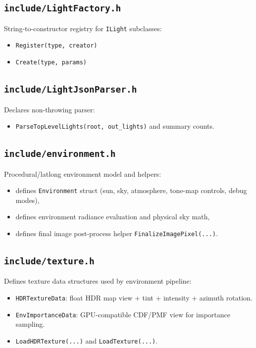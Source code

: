 \documentclass[11pt]{article}
\begin{document}
\subsection{\texttt{include/LightFactory.h}}
String-to-constructor registry for \verb|ILight| subclasses:
\begin{itemize}[leftmargin=1.5em]
  \item \verb|Register(type, creator)|
  \item \verb|Create(type, params)|
\end{itemize}

\subsection{\texttt{include/LightJsonParser.h}}
Declares non-throwing parser:
\begin{itemize}[leftmargin=1.5em]
  \item \verb|ParseTopLevelLights(root, out_lights)| and summary counts.
\end{itemize}

\subsection{\texttt{include/environment.h}}
Procedural/latlong environment model and helpers:
\begin{itemize}[leftmargin=1.5em]
  \item defines \verb|Environment| struct (sun, sky, atmosphere, tone-map controls, debug modes),
  \item defines environment radiance evaluation and physical sky math,
  \item defines final image post-process helper \verb|FinalizeImagePixel(...)|.
\end{itemize}

\subsection{\texttt{include/texture.h}}
Defines texture data structures used by environment pipeline:
\begin{itemize}[leftmargin=1.5em]
  \item \verb|HDRTextureData|: float HDR map view + tint + intensity + azimuth rotation.
  \item \verb|EnvImportanceData|: GPU-compatible CDF/PMF view for importance sampling.
  \item \verb|LoadHDRTexture(...)| and \verb|LoadTexture(...)|.
\end{itemize}
\end{document}
